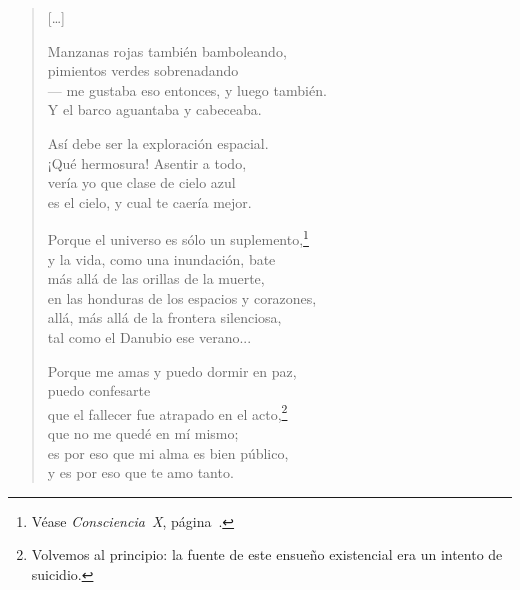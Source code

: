 \documentclass[11pt]{book}
\newcommand*{\centeredornament}{\centerline{\pgfornament[width=6cm]{88}}}
\begin{document}
\begin{verse}
  \textnormal{[\ldots]}

  Manzanas rojas también bamboleando, \\
  pimientos verdes sobrenadando \\
  --- me gustaba eso entonces, y luego también. \\
  Y el barco aguantaba y cabeceaba.

  Así debe ser la exploración espacial. \\
  ¡Qué hermosura! Asentir a todo, \\
  vería yo que clase de cielo azul \\
  es el cielo, y cual te caería mejor.

  Porque el universo es sólo un suplemento,\footnote{Véase
  \emph{Consciencia~X}, página~\pageref{consciencia_X}.} \\
  y la vida, como una inundación, bate \\
  más allá de las orillas de la muerte, \\
  en las honduras de los espacios y corazones, \\
  allá, más allá de la frontera silenciosa, \\
  tal como el Danubio ese verano...

  Porque me amas y puedo dormir en paz, \\
  puedo confesarte \\
  que el fallecer fue atrapado en el acto,\footnote{Volvemos al principio:
  la fuente de este ensueño existencial era un intento de
  suicidio.} \\
  que no me quedé en mí mismo; \\
  es por eso que mi alma es bien público, \\
  y es por eso que te amo tanto.
\end{verse}

\newpage

\vspace*{-15mm}
\centeredornament


\end{document}
